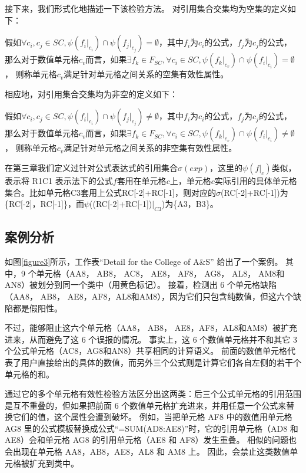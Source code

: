 接下来，我们形式化地描述一下该检验方法。
对引用集合交集均为空集的定义如下：
\begin{definition}
    假如$\forall c_i,c_j \in SC,\psi(f_i|_{c_i}) \cap \psi(f_j|_{c_j}) = \emptyset$，其中$f_i$为$c_i$的公式，$f_j$为$c_j$的公式，
    那么对于数值单元格$c_v$而言，如果$\exists f_k \in F_{SC}, \forall c_i \in SC, \psi(f_k|_{c_v}) \cap \psi(f_i|_{c_i}) = \emptyset$，
    则称单元格$c_v$满足针对单元格之间关系的空集有效性属性。
\end{definition}

相应地，对引用集合交集均为非空的定义如下：
\begin{definition}
    假如$\forall c_i,c_j \in SC,\psi(f_i|_{c_i}) \cap \psi(f_j|_{c_j}) \neq \emptyset$，其中$f_i$为$c_i$的公式，$f_j$为$c_j$的公式，
    那么对于数值单元格$c_v$而言，如果$\exists f_k \in F_{SC}, \forall c_i \in SC, \psi(f_k|_{c_v}) \cap \psi(f_i|_{c_i}) \neq \emptyset$，
    则称单元格$c_v$满足针对单元格之间关系的非空集有效性属性。 
\end{definition}

在第三章我们定义过针对公式表达式的引用集合$\sigma(exp)$，这里的$\psi(f|_c)$类似，表示将 R1C1 表示法下的公式$f$套用在单元格$c$上，单元格$c$实际引用的具体单元格集合。比如单元格C3套用上公式RC[-2]+RC[-1]，则对应的$\sigma$(RC[-2]+RC[-1])为\{RC[-2]，RC[-1]\}，而$\psi$((RC[-2]+RC[-1])$|_{C3}$)为\{A3，B3\}。

\subsection*{案例分析}

如图\ref{figure3}所示，工作表“Detail for the College of A\&S” 给出了一个案例。
其中，9 个单元格（AA8， AB8， AC8， AE8， AF8， AG8， AL8， AM8和AN8）被\cu 划分到同一个类中（用黄色标记）。
接着，\cu 检测出 6 个单元格缺陷（AA8， AB8， AE8，AF8，AL8和AM8），因为它们只包含纯数值，但这六个缺陷都是假阳性。

不过，\wa 能够阻止这六个单元格（AA8， AB8， AE8，AF8，AL8和AM8）被扩充进来，从而避免了这 6 个误报的情况。
事实上，这 6 个数值单元格并不和其它 3 个公式单元格（AC8，AG8和AN8）共享相同的计算语义。
前面的数值单元格代表了用户直接给出的具体的数值，而另外三个公式则是计算它们各自左侧的若干个单元格的和。

\wa 通过它的多个单元格有效性检验方法区分出这两类：后三个公式单元格的引用范围是互不重叠的，但如果把前面 6 个数值单元格扩充进来，并用任意一个公式来替换它们的值，这个属性会遭到破坏。
例如，当把单元格 AF8 中的数值用单元格 AG8 里的公式模板替换成公式“=SUM(AD8:AE8)”时，它的引用单元格（AD8 和 AE8）会和单元格 AG8 的引用单元格（AE8 和 AF8）发生重叠。
相似的问题也会出现在单元格 AA8，AB8，AE8，AL8 和 AM8 上。
因此，\wa 会禁止这类数值单元格被扩充到类中。


